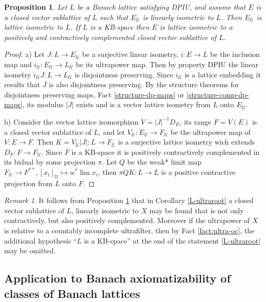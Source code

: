 \documentclass[11pt]{amsart}
\theoremstyle{plain}
\newtheorem{proposition}[theorem]{Proposition}
\theoremstyle{remark}
\newtheorem{remark}[theorem]{Remark}
\newcommand{\U}{\mathcal U}
\begin{document}
\begin{proposition}\label{L-ultraroot-2}
 Let $L$ be a  Banach lattice satisfying DPIU, and assume that $E$ is a closed vector sublattice of $L$ such that $E_\U$ is linearly isometric to $L$. Then $E_\U$ is lattice isometric to $L$. If $L$ is a KB-space then $E$ is lattice isometric to a positively and contractively complemented closed vector sublattice of  $L$.
\end{proposition}

\begin{proof}
 a) Let $J: L\to E_\U$ be a surjective linear isometry, $i:E\to L$ be the inclusion map  and $i_\U: E_\U\to L_\U$ be its ultrapower map. Then by property DPIU the linear isometry $i_\U J: L\to L_\U$ is disjointness preserving. Since $i_\U$ is a lattice embedding it results that $J$ is also disjointness preserving. By the structure theorems for disjointness preserving maps, Fact \ref{structure-dp-maps} or \ref{structure-comp-dp-maps}, its modulus $|J|$ exists and is a vector lattice isometry from $L$ onto $E_\U$.
 
 b) Consider the vector lattice isomorphism $V= |J|^{-1}D_E$, its range $F=V(E)$ is a closed vector sublattice of $L$, and let $V_\U: E_\U\to F_\U$ be the ultrapower map of $V: E\to F$. Then $K= V_\U |J|: L\to F_\U $ is a surjective lattice isometry wich extends $D_F: F\to F_\U$. Since $F$ is a KB-space it is positively contractively complemented in its bidual by some projection $\pi$. Let $Q$ be the weak* limit  map $F_\U\to F^{**}, [x_i]_\U\mapsto w^*\lim x_i$, then $\pi QK: L\to L$ is a positive contractive projection from $L$ onto $F$. 
 \end{proof}

\begin{remark}
 It follows from Proposition  \ref{L-ultraroot-2} that in Corollary \ref{L-ultraroot} a closed vector sublattice of $L$,  linearly isometric to $X$ may be found that is not only contractively, but also positively complemented. Moreover if the ultrapower of $X$ is relative to a countably incomplete ultrafilter, then by Fact \ref{fact:ultra-oc}, the additional hypothesis ``$L$ is a KB-space'' at the end of  the  statement \ref{L-ultraroot} may be omitted.  
\end{remark}


\subsection{Application to Banach axiomatizability of classes of Banach lattices}
\end{document}
